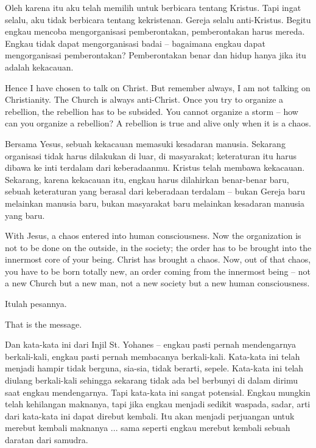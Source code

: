 \bahasa
Oleh karena itu aku telah memilih untuk berbicara tentang Kristus. Tapi ingat selalu, aku tidak berbicara tentang kekristenan. Gereja selalu anti-Kristus. Begitu engkau mencoba mengorganisasi pemberontakan, pemberontakan harus mereda. Engkau tidak dapat mengorganisasi badai -- bagaimana engkau dapat mengorganisasi pemberontakan? Pemberontakan benar dan hidup hanya jika itu adalah kekacauan.

\english
Hence I have chosen to talk on Christ. But remember always, I am not talking on Christianity. The Church is always anti-Christ. Once you try to organize a rebellion, the rebellion has to be subsided. You cannot organize a storm -- how can you organize a rebellion? A rebellion is true and alive only when it is a chaos.

\bahasa
Bersama Yesus, sebuah kekacauan memasuki kesadaran manusia. Sekarang organisasi tidak harus dilakukan di luar, di masyarakat; keteraturan itu harus dibawa ke inti terdalam dari keberadaanmu. Kristus telah membawa kekacauan. Sekarang, karena kekacauan itu, engkau harus dilahirkan benar-benar baru, sebuah keteraturan yang berasal dari keberadaan terdalam -- bukan Gereja baru melainkan manusia baru, bukan masyarakat baru melainkan kesadaran manusia yang baru.

\english
With Jesus, a chaos entered into human consciousness. Now the organization is not to be done on the outside, in the society; the order has to be brought into the innermost core of your being. Christ has brought a chaos. Now, out of that chaos, you have to be born totally new, an order coming from the innermost being -- not a new Church but a new man, not a new society but a new human consciousness.

\bahasa
Itulah pesannya.

\english
That is the message.

\bahasa
Dan kata-kata ini dari Injil St. Yohanes -- engkau pasti pernah mendengarnya berkali-kali, engkau pasti pernah membacanya berkali-kali. Kata-kata ini telah menjadi hampir tidak berguna, sia-sia, tidak berarti, sepele. Kata-kata ini telah diulang berkali-kali sehingga sekarang tidak ada bel berbunyi di dalam dirimu saat engkau mendengarnya. Tapi kata-kata ini sangat potensial. Engkau mungkin telah kehilangan maknanya, tapi jika engkau menjadi sedikit waspada, sadar, arti dari kata-kata ini dapat direbut kembali. Itu akan menjadi perjuangan untuk merebut kembali maknanya ... sama seperti engkau merebut kembali sebuah daratan dari samudra.

